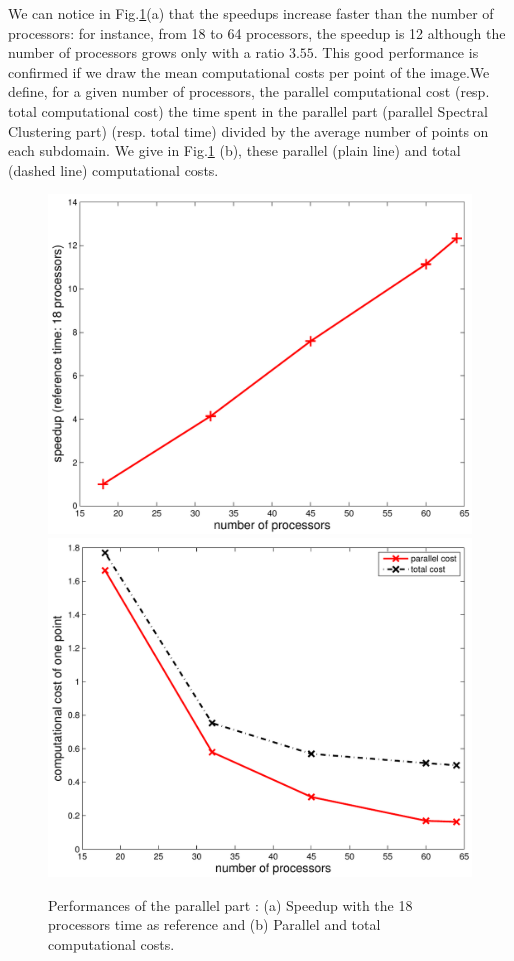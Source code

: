\documentclass[]{svmult}
\begin{document}

We can notice in Fig.\ref{fig:costs}(a)  that the speedups increase faster than the number of processors:
for instance, from 18 to 64 processors, the speedup is 12 although the number
of processors grows only with a ratio $3.55$. This good performance is confirmed if we draw the mean computational costs per
point of the image.We define, for a given number of processors, the parallel computational cost
(resp. total computational cost) the time spent in the parallel part (parallel
Spectral Clustering part) (resp. total time) divided by the average number of
points on each subdomain. We give in Fig.\ref{fig:costs} (b), these parallel
(plain line) and total (dashed line) computational costs.

\begin{figure}
  \begin{center}
    {\includegraphics[width=0.35\linewidth]{speedup}}
    \hspace{2cm}
    {\includegraphics[width=0.35\linewidth]{cost}}
  \end{center}
  \caption{Performances of the parallel part : (a) Speedup with the 18
  processors time as reference and (b) Parallel and total computational
  costs.}
  \label{fig:costs}
 \end{figure}
\end{document}
